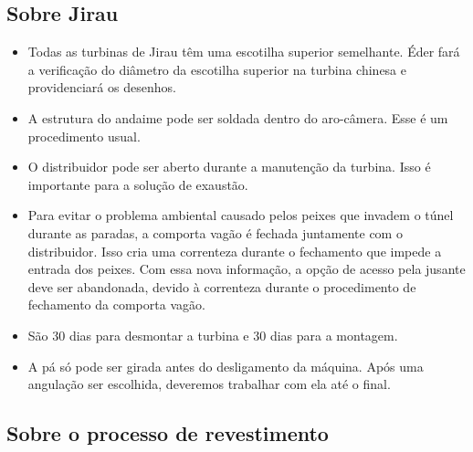 \documentclass[12pt,a4paper]{article}
\begin{document}
\subsection{Sobre Jirau}

\begin{itemize}
  \item Todas as turbinas de Jirau têm uma escotilha superior semelhante. Éder
  fará a verificação do diâmetro da escotilha superior na turbina chinesa e providenciará os desenhos.

  \item A estrutura do andaime pode ser soldada dentro do aro-câmera. Esse é um procedimento usual.
  
  \item O distribuidor pode ser aberto durante a manutenção da turbina. Isso é
  importante para a solução de exaustão.
  
  \item Para evitar o problema ambiental causado pelos peixes que invadem o
  túnel durante as paradas, a comporta vagão é fechada juntamente com o
  distribuidor. Isso cria uma correnteza durante o fechamento que impede a
  entrada dos peixes. Com essa nova informação, a opção de acesso pela
  jusante deve ser abandonada, devido à correnteza durante o procedimento de
  fechamento da comporta vagão.
  
  \item São 30 dias para desmontar a turbina e 30 dias para a montagem.
  
  \item A pá só pode ser girada antes do desligamento da máquina. Após uma
  angulação ser escolhida, deveremos trabalhar com ela até o final.

\end{itemize}

\subsection{Sobre o processo de revestimento}
\end{document}
